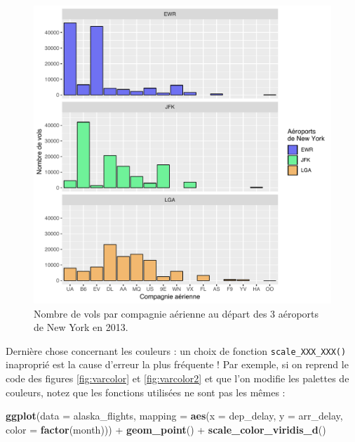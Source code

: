 \documentclass[a4paperpaper,]{article}
\newenvironment{Shaded}{\begin{snugshade}}{\end{snugshade}}
\newcommand{\DataTypeTok}[1]{\textcolor[rgb]{0.00,0.34,0.68}{#1}}
\newcommand{\KeywordTok}[1]{\textcolor[rgb]{0.12,0.11,0.11}{\textbf{#1}}}
\newcommand{\NormalTok}[1]{\textcolor[rgb]{0.12,0.11,0.11}{#1}}
\newcommand{\OperatorTok}[1]{\textcolor[rgb]{0.12,0.11,0.11}{#1}}
\newcommand{\StringTok}[1]{\textcolor[rgb]{0.75,0.01,0.01}{#1}}
\theoremstyle{definition}
\theoremstyle{definition}
\theoremstyle{definition}
\theoremstyle{remark}
\begin{document}
\begin{figure}[htpb]

{\centering \includegraphics[width=0.9\linewidth]{figure/barfacethex-1} 

}

\caption{Nombre de vols par compagnie aérienne au départ des 3 aéroports de New York en 2013.}\label{fig:barfacethex}
\end{figure}

Dernière chose concernant les couleurs : un choix de fonction
\texttt{scale\_XXX\_XXX()} inaproprié est la cause d'erreur la plus
fréquente ! Par exemple, si on reprend le code des figures
\ref{fig:varcolor} et \ref{fig:varcolor2} et que l'on modifie les
palettes de couleurs, notez que les fonctions utilisées ne sont pas les
mêmes :

\begin{Shaded}
\begin{Highlighting}[]
\KeywordTok{ggplot}\NormalTok{(}\DataTypeTok{data =}\NormalTok{ alaska_flights, }\DataTypeTok{mapping =} \KeywordTok{aes}\NormalTok{(}\DataTypeTok{x =}\NormalTok{ dep_delay, }\DataTypeTok{y =}\NormalTok{ arr_delay, }\DataTypeTok{color =} \KeywordTok{factor}\NormalTok{(month))) }\OperatorTok{+}
\StringTok{  }\KeywordTok{geom_point}\NormalTok{() }\OperatorTok{+}
\StringTok{  }\KeywordTok{scale_color_viridis_d}\NormalTok{()}
\end{Highlighting}
\end{Shaded}
\end{document}
